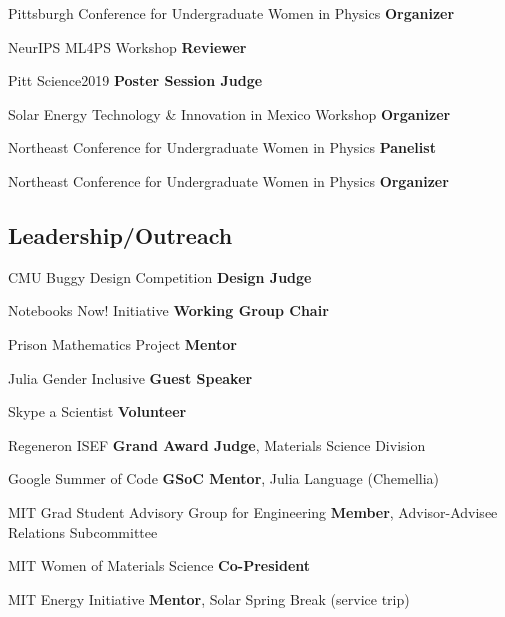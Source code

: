{Pittsburgh Conference for Undergraduate Women in Physics}
{\textbf{Organizer}}
{}

{NeurIPS ML4PS Workshop}
{\textbf{Reviewer}}
{}

{Pitt Science2019}
{\textbf{Poster Session Judge}}
{}

{Solar Energy Technology \& Innovation in Mexico Workshop}
{\textbf{Organizer}}
{}

{Northeast Conference for Undergraduate Women in Physics}
{\textbf{Panelist}}
{}

{Northeast Conference for Undergraduate Women in Physics}
{\textbf{Organizer}}
{}

\vspace{-2mm}
\subsection{Leadership/Outreach}

                      {CMU Buggy Design Competition}
                      {\textbf{Design Judge}}
                      {}

{Notebooks Now! Initiative}
{\textbf{Working Group Chair}}
{}

{Prison Mathematics Project}
{\textbf{Mentor}}
{}

{Julia Gender Inclusive}
{\textbf{Guest Speaker}}
{}

{Skype a Scientist}
{\textbf{Volunteer}}
{}

{Regeneron ISEF}
{\textbf{Grand Award Judge}, Materials Science Division}
{}

{Google Summer of Code}
{\textbf{GSoC Mentor}, Julia Language (Chemellia)}
{}

{MIT Grad Student Advisory Group for Engineering}
{\textbf{Member}, Advisor-Advisee Relations Subcommittee}
{}

{MIT Women of Materials Science}
{\textbf{Co-President}}
{}

{MIT Energy Initiative}
{\textbf{Mentor}, Solar Spring Break (service trip)}
{}

